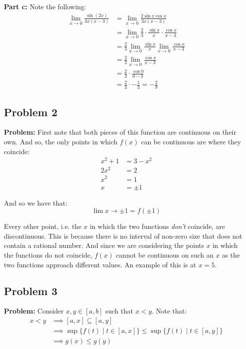 \documentclass{article}
\begin{document}
\noindent\textbf{Part c:} Note the following:
\begin{align*}
  \lim_{x\to0}\frac{\sin(2x)}{3x(x-3)}&=\lim_{x\to0}\frac{2\sin x\cos x}{3x(x-3)}\tag{double angle formula}\\
  &=\lim_{x\to0}\frac{2}{3}\cdot\frac{\sin x}{x}\cdot\frac{\cos x}{x-3}\\
  &=\frac{2}{3}\lim_{x\to0}\frac{\sin x}{x}\lim_{x\to0}\frac{\cos x}{x-3}\tag{product of limits is limit of products}\\
  &=\frac{2}{3}\lim_{x\to0}\frac{\cos x}{x-3}\tag{limit given}\\
  &=\frac{2}{3}\cdot\frac{\cos 0}{0-3}\tag{$\cos$ is contious at 0}\\
  &=\frac{2}{3}\cdot-\frac{1}{3}=-\frac{2}{9}
\end{align*}
\bigskip

\subsection*{Problem 2}
\noindent\textbf{Problem:} First note that both pieces of this function are continuous on their own. And so, the only points in which $f(x)$ can be continuous are where they coincide:
\begin{align*}
  x^2+1&=3-x^2\\
  2x^2&=2\\
  x^2&=1\\
  x&=\pm1
\end{align*}

And so we have that:
$$\lim{x\to\pm1}=f(\pm1)$$

Every other point, i.e. the $x$ in which the two functions \textit{don't} coincide, are discontinuous. This is because there is no interval of non-zero size that does not contain a rational number. And since we are considering the points $x$ in which the functions do not coincide, $f(x)$ cannot be continuous on such an $x$ as the two functions approach different values. An example of this is at $x=5$.
\bigskip

\subsection*{Problem 3}
\noindent\textbf{Problem:} Consider $x,y\in[a,b]$ such that $x<y$. Note that:
\begin{align*}
  x<y&\implies[a,x]\subseteq[a,y]\\
  &\implies\sup\{f(t)\mid t\in[a,x]\}\le\sup\{f(t)\mid t\in[a,y]\}\\
  &\implies g(x)\le g(y)\tag{def. of $g$}
\end{align*}
\end{document}
